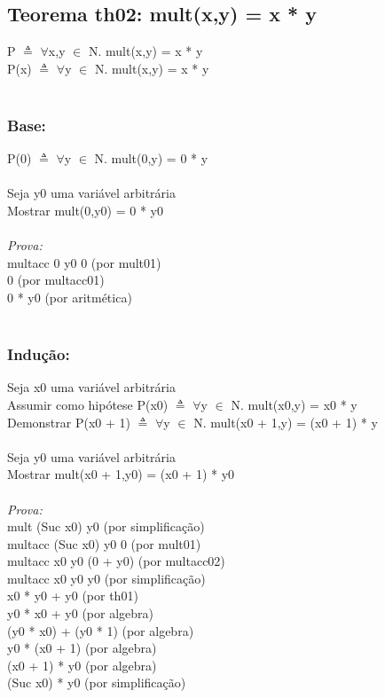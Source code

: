 \documentclass{article}
\begin{document}
\subsection{Teorema th02: mult(x,y) = x * y}
P $\triangleq$ $\forall$x,y $\in$ N. mult(x,y) = x * y
\\P(x) $\triangleq$ $\forall$y $\in$ N. mult(x,y) = x * y
\\
\\\subsubsection{Base:} P(0) $\triangleq$ $\forall$y $\in$ N. mult(0,y) = 0 * y
\\
\\Seja y0 uma variável arbitrária
\\Mostrar mult(0,y0) = 0 * y0
\\
\\\textit{Prova:}
\\multacc 0 y0 0 (por mult01)
\\0 (por multacc01)
\\0 * y0 (por aritmética)
\\
\\\subsubsection{Indução:}
Seja x0 uma variável arbitrária
\\Assumir como hipótese P(x0) $\triangleq$ $\forall$y $\in$ N. mult(x0,y) = x0 * y
\\Demonstrar P(x0 + 1) $\triangleq$ $\forall$y $\in$ N. mult(x0 + 1,y) = (x0 + 1) * y
\\
\\Seja y0 uma variável arbitrária
\\Mostrar mult(x0 + 1,y0) = (x0 + 1) * y0
\\
\\\textit{Prova:}
\\mult (Suc x0) y0 (por simplificação)
\\multacc (Suc x0) y0 0 (por mult01)
\\multacc x0 y0 (0 + y0) (por multacc02)
\\multacc x0 y0 y0 (por simplificação)
\\x0 * y0 + y0 (por th01)
\\y0 * x0 + y0 (por algebra)
\\(y0 * x0) + (y0 * 1) (por algebra)
\\y0 * (x0 + 1) (por algebra)
\\(x0 + 1) * y0 (por algebra)
\\(Suc x0) * y0 (por simplificação)     
\end{document}
